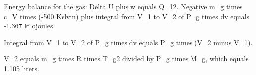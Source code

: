 Energy balance for the gas:  
Delta U plus w equals Q_12.  
Negative m_g times c_V times (-500 Kelvin) plus integral from V_1 to V_2 of P_g times dv equals -1.367 kilojoules.  

Integral from V_1 to V_2 of P_g times dv equals P_g times (V_2 minus V_1).  

V_2 equals m_g times R times T_g2 divided by P_g times M_g, which equals 1.105 liters.